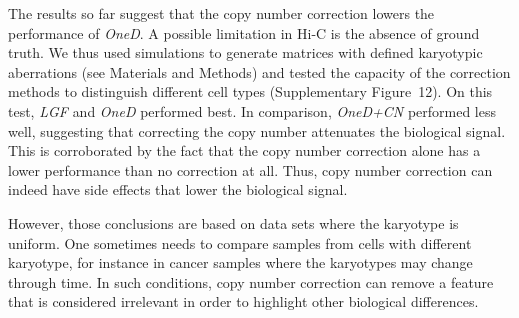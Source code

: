 \documentclass[a4,center,fleqn]{NAR}
\providecommand{\DIFadd}[1]{{\protect\color{red}#1}} %
\providecommand{\DIFdel}[1]{{\protect}}                      %
\providecommand{\DIFaddbegin}{} %
\providecommand{\DIFaddend}{} %
\providecommand{\DIFdelbegin}{} %
\providecommand{\DIFdelend}{} %
\begin{document}
\DIFdelbegin \DIFdel{Removing the explicit experimental biases enhances the importance of the
copy number in the signal (Figure~\ref{fig:copy_number}). The copy number
is not an experimental bias, but it may be considered an additional source
of bias to be removed. For this reason, }\DIFdelend \DIFaddbegin \DIFadd{The results so far suggest that the copy number correction lowers the
performance of }\DIFaddend \textit{OneD}\DIFdelbegin \DIFdel{also allows the user
to correct the copy number and output an euploid-equivalent matrix. To do
so, }\DIFdelend \DIFaddbegin \DIFadd{. A possible limitation in Hi-C is the absence
of ground truth. We thus used simulations to generate matrices with
defined karyotypic aberrations (see Materials and Methods) and tested the
capacity of the correction methods to distinguish different cell types
(Supplementary Figure~12). On this test, }\textit{\DIFadd{LGF}} \DIFadd{and }\DIFaddend \textit{OneD}
\DIFdelbegin \DIFdel{segments the linear signalof the total amount of
contacts into piecewise homogeneous regions}\DIFdelend \DIFaddbegin \DIFadd{performed best. In comparison, }\textit{\DIFadd{OneD+CN}} \DIFadd{performed less well,
suggesting that correcting the copy number attenuates the biological
signal}\DIFaddend . This is \DIFdelbegin \DIFdel{carried out by a
hidden Markov model whereby the averages of the states are constrained to
be an integer number , up to a scaling factor (see \ref{sec:hmm}). This
allows the model to detect regions with a number of copies equal to 1, 2,
3 }\textit{\DIFdel{etc}}%
\DIFdel{. With the inferred number of copies at hand, }\textit{\DIFdel{OneD}}
\DIFdel{then normalizes each cell
of the matrix with equation (\ref{eq:cnvnorm}). }\DIFdelend \DIFaddbegin \DIFadd{corroborated by the fact that the copy number correction
alone has a lower performance than no correction at all. Thus, copy number
correction can indeed have side effects that lower the biological signal.
}\DIFaddend 

\DIFdelbegin \DIFdel{Different normalization methods can either enhance or diminish the signal
in regions with higher copy number }\DIFdelend \DIFaddbegin \DIFadd{However, those conclusions are based on data sets where the karyotype is
uniform. One sometimes needs to compare samples from cells with different
karyotype, for instance in cancer samples where the karyotypes may change
through time. In such conditions, copy number correction can remove a
feature that is considered irrelevant in order to highlight other
biological differences.
}
\end{document}
